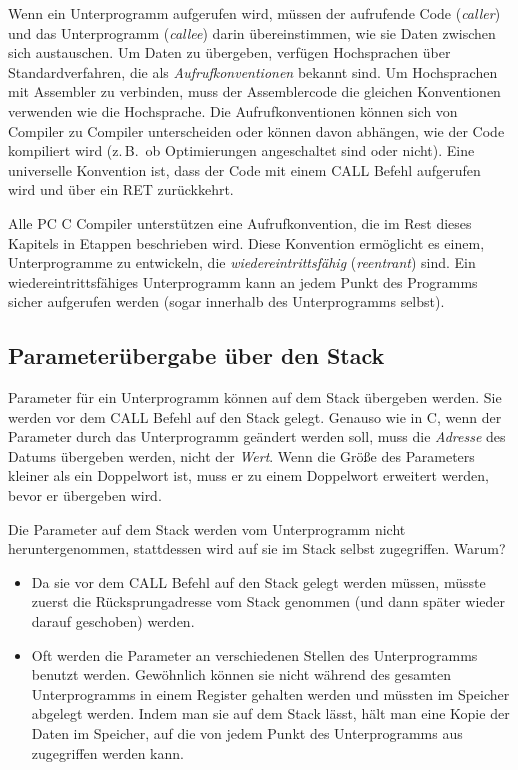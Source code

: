 Wenn ein Unterprogramm aufgerufen wird, m\"{u}ssen der aufrufende Code
(\emph{caller}) und das Unterprogramm (\emph{callee}) darin
\"{u}bereinstimmen, wie sie Daten zwischen sich austauschen. Um Daten zu
\"{u}bergeben, verf\"{u}gen Hochsprachen \"{u}ber Standardverfahren, die als
\emph{Aufrufkonventionen} bekannt sind. Um Hochsprachen mit
Assembler zu verbinden, muss der Assemblercode die gleichen
Konventionen verwenden wie die Hochsprache. Die Aufrufkonventionen
k\"{o}nnen sich von Compiler zu Compiler unterscheiden oder k\"{o}nnen davon
abh\"{a}ngen, wie der Code kompiliert wird (z.\,B.\ ob Optimierungen
angeschaltet sind oder nicht). Eine universelle Konvention ist, dass
der Code mit einem {\code CALL} Befehl aufgerufen wird und \"{u}ber ein
{\code RET} zur\"{u}ckkehrt.

Alle PC C Compiler unterst\"{u}tzen eine Aufrufkonvention, die im Rest
dieses Kapitels in Etappen beschrieben wird. Diese Konvention
erm\"{o}glicht es einem, Unterprogramme zu entwickeln, die
\emph{wiedereintrittsf\"{a}hig} (\emph{reentrant}) sind. Ein
wiedereintrittsf\"{a}higes Unterprogramm kann an jedem Punkt des
Programms sicher aufgerufen werden (sogar innerhalb des
Unterprogramms selbst).

\subsection{Parameter\"{u}bergabe \"{u}ber den Stack}

Parameter f\"{u}r ein Unterprogramm k\"{o}nnen auf dem Stack \"{u}bergeben
werden. Sie werden vor dem {\code CALL} Befehl auf den Stack gelegt.
Genauso wie in C, wenn der Parameter durch das Unterprogramm
ge\"{a}ndert werden soll, muss die \emph{Adresse} des Datums \"{u}bergeben
werden, nicht der \emph{Wert}. Wenn die Gr\"{o}{\ss}e des Parameters kleiner
als ein Doppelwort ist, muss er zu einem Doppelwort erweitert
werden, bevor er \"{u}bergeben wird.

Die Parameter auf dem Stack werden vom Unterprogramm nicht
heruntergenommen, stattdessen wird auf sie im Stack selbst
zugegriffen. Warum?
\begin{itemize}
\parskip=-0.10em %

\item Da sie vor dem {\code CALL} Befehl auf den Stack gelegt werden
m\"{u}ssen, m\"{u}sste zuerst die R\"{u}cksprungadresse vom Stack genommen (und
dann sp\"{a}ter wieder darauf geschoben) werden.

\item Oft werden die Parameter an verschiedenen Stellen des
Unterprogramms benutzt werden. Gew\"{o}hnlich k\"{o}nnen sie nicht w\"{a}hrend
des gesamten Unterprogramms in einem Register gehalten werden und
m\"{u}ssten im Speicher abgelegt werden. Indem man sie auf dem Stack
l\"{a}sst, h\"{a}lt man eine Kopie der Daten im Speicher, auf die von jedem
Punkt des Unterprogramms aus zugegriffen werden kann.
\end{itemize}

